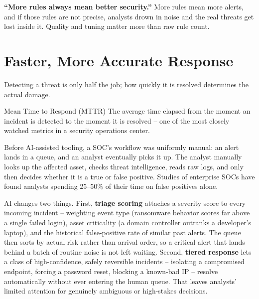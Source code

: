 \begin{misconception}
\textbf{``More rules always mean better security.''} More rules mean more alerts, and if those
rules are not precise, analysts drown in noise and the real threats get lost inside it. Quality
and tuning matter more than raw rule count.
\end{misconception}

\section{Faster, More Accurate Response}

Detecting a threat is only half the job; how quickly it is resolved determines the actual damage.

\begin{definition}{Mean Time to Respond (MTTR)}
The average time elapsed from the moment an incident is detected to the moment it is resolved --
one of the most closely watched metrics in a security operations center.
\end{definition}

Before AI-assisted tooling, a SOC's workflow was uniformly manual: an alert lands in a queue, and
an analyst eventually picks it up. The analyst manually looks up the affected asset, checks threat
intelligence, reads raw logs, and only then decides whether it is a true or false positive.
Studies of enterprise SOCs have found analysts spending 25--50\% of their time on false positives
alone.

AI changes two things. First, \textbf{triage scoring} attaches a severity score to every incoming
incident -- weighting event type (ransomware behavior scores far above a single failed login),
asset criticality (a domain controller outranks a developer's laptop), and the historical
false-positive rate of similar past alerts. The queue then sorts by actual risk rather than
arrival order, so a critical alert that lands behind a batch of routine noise is not left waiting.
Second, \textbf{tiered response} lets a class of high-confidence, safely reversible incidents --
isolating a compromised endpoint, forcing a password reset, blocking a known-bad IP -- resolve
automatically without ever entering the human queue. That leaves analysts' limited attention for
genuinely ambiguous or high-stakes decisions.

